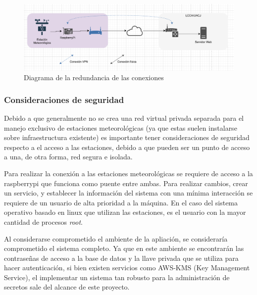 \begin{figure}[!ht]
	\centering
	\includegraphics[width=.75\linewidth]{images/diagrams/conexion.png}
	\caption{Diagrama de la redundancia de las conexiones}
	\label{fig:conexion_redundancia}
\end{figure}



\subsubsection{Consideraciones de seguridad}

Debido a que generalmente no se crea una red virtual privada separada para el manejo exclusivo de estaciones meteorológicas (ya que estas suelen instalarse sobre infraestructura existente) es importante tener consideraciones de seguridad respecto a el acceso a las estaciones, debido a que pueden ser un punto de acceso a una, de otra forma, red segura e isolada.

Para realizar la conexión a las estaciones meteorológicas se requiere de acceso a la raspberrypi que funciona como puente entre ambas. Para realizar cambios, crear un servicio, y establecer la información del sistema con una mínima interacción se requiere de un usuario de alta prioridad a la máquina. En el caso del sistema operativo basado en linux que utilizan las estaciones, es el usuario con la mayor cantidad de procesos \emph{root}.

Al considerarse comprometido el ambiente de la apliación, se consideraría comprometido el sistema completo. Ya que en este ambiente se encontrarán las contraseñas de acceso a la base de datos y la llave privada que se utiliza para hacer autenticación, si bien existen servicios como AWS-KMS (Key Management Service), el implementar un sistema tan robusto para la administración de secretos sale del alcance de este proyecto.

